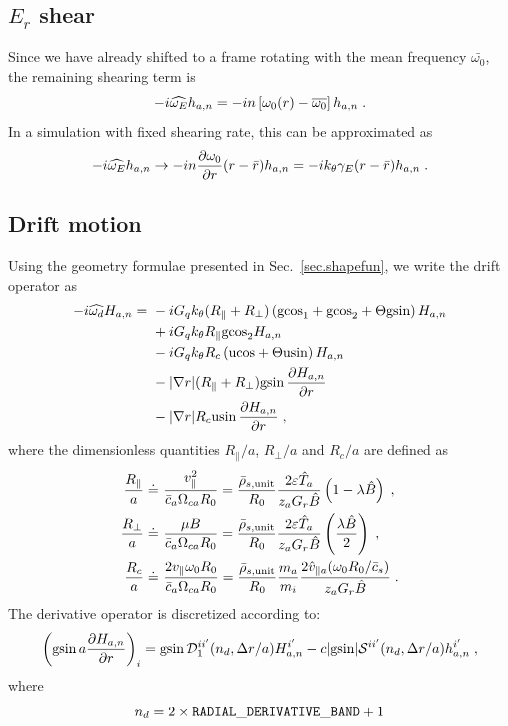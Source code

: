 \subsection{$E_r$ shear}

Since we have already shifted to a frame rotating with the
mean frequency $\bar{\omega_0}$, the remaining shearing term is
%
\begin{equation}
-i \widehat{\omega_E} h_{a,n} = -i n \left[ \omega_0(r)-\overline{\omega_0} 
\right] h_{a,n} \; .
\end{equation}
%
In a simulation with fixed shearing rate, this can be approximated as  
%
\begin{equation}
-i \widehat{\omega_E} h_{a,n}  \rightarrow 
 -i n \frac{\partial\omega_0}{\partial r} (r-\bar{r}) h_{a,n} = 
 -i k_\theta \gamma_E (r-\bar{r}) h_{a,n} \; .
\end{equation}

\subsection{Drift motion}

Using the geometry formulae presented in Sec.~\ref{sec.shapefun}, we write
the drift operator as
%
\begin{align}
-i \widehat{\omega_d} H_{a,n} = &~
- i G_q k_\theta (R_\parallel + R_\perp) \left( \text{gcos}_1 + \text{gcos}_2 + 
 \Theta \text{gsin} \right) H_{a,n} \\
&~ + i G_q k_\theta R_\parallel \text{gcos}_2 H_{a,n} \\
&~ - i G_q k_\theta R_c \left( \text{ucos} + \Theta \text{usin} \right) H_{a,n} \\
&~ - | \nabla r | (R_\parallel + R_\perp) \text{gsin} 
 \, \frac{\partial H_{a,n}}{\partial r} \\
&~ - | \nabla r | R_c \text{usin}  \, \frac{\partial H_{a,n}}{\partial r} \; ,
\end{align}
%
where the dimensionless quantities $R_\parallel/a$, $R_\perp/a$ and 
$R_c/a$ are defined as
%
\begin{align}
\frac{R_\parallel}{a} \doteq 
 &~\frac{v_\parallel^2}{\bar{c}_a \Omega_{ca} R_0} 
= \frac{\bar{\rho}_{s,{\rm unit}}}{R_0} \frac{2 {\varepsilon} \hat{T}_a}{z_a G_r \hat{B}} 
 \left(1-\lambda \hat{B} \right) \; , \\
\frac{R_\perp}{a} \doteq 
 &~\frac{\mu B}{\bar{c}_a \Omega_{ca} R_0} 
= \frac{\bar{\rho}_{s,{\rm unit}}}{R_0} \frac{2 {\varepsilon} \hat{T}_a}{z_a G_r \hat{B}} 
 \left( \frac{\lambda \hat{B}}{2} \right) \; , \\ 
\frac{R_c}{a} \doteq 
 &~\frac{2 v_\parallel \omega_0 R_0}{\bar{c}_a \Omega_{ca} R_0} 
= \frac{\bar{\rho}_{s,{\rm unit}}}{R_0} \frac{m_a}{m_i} 
\frac{2 \hat{v}_{\parallel a}(\omega_0 R_0/\bar{c}_s)}{z_a G_r \hat{B}} \; . 
\end{align}
%
The derivative operator is discretized according to:
%
\begin{equation}
\left( \text{gsin} \, a \frac{\partial H_{a,n}}{\partial r} \right)_i =
\text{gsin} \, {\cal D}_1^{ii^\prime}(n_d,\Delta r/a) H_{a,n}^{i^\prime} 
 - c |\text{gsin}| {\cal S}^{ii^\prime}(n_d,\Delta r/a) h_{a,n}^{i^\prime} \; ,
\end{equation}
%
where
%
\begin{equation}
n_d = 2 \times {\tt RADIAL\_DERIVATIVE\_BAND} + 1
\end{equation}

